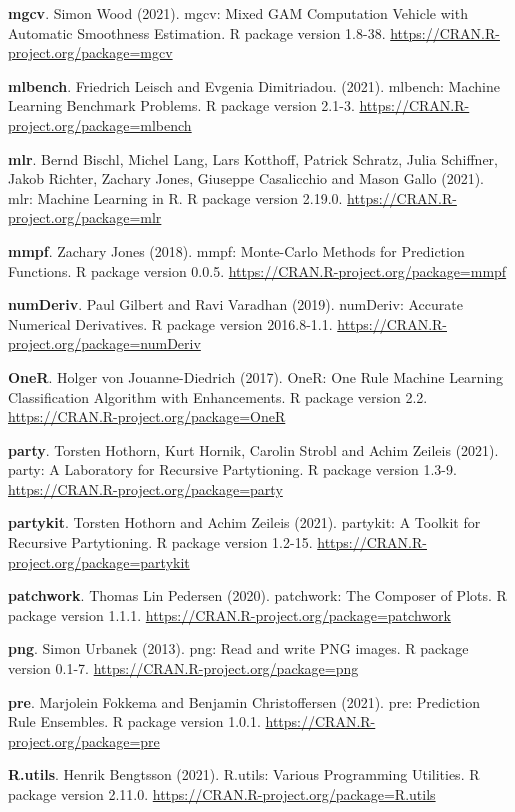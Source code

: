 \documentclass[
  11pt,
]{scrbook}
\begin{document}
\textbf{mgcv}. Simon Wood (2021). mgcv: Mixed GAM Computation Vehicle with Automatic Smoothness
Estimation. R package version 1.8-38. \url{https://CRAN.R-project.org/package=mgcv}

\textbf{mlbench}. Friedrich Leisch and Evgenia Dimitriadou. (2021). mlbench: Machine Learning Benchmark Problems. R package version 2.1-3. \url{https://CRAN.R-project.org/package=mlbench}

\textbf{mlr}. Bernd Bischl, Michel Lang, Lars Kotthoff, Patrick Schratz, Julia Schiffner, Jakob Richter, Zachary Jones, Giuseppe Casalicchio and Mason Gallo (2021). mlr: Machine Learning in R. R package version 2.19.0. \url{https://CRAN.R-project.org/package=mlr}

\textbf{mmpf}. Zachary Jones (2018). mmpf: Monte-Carlo Methods for Prediction Functions. R package version 0.0.5. \url{https://CRAN.R-project.org/package=mmpf}

\textbf{numDeriv}. Paul Gilbert and Ravi Varadhan (2019). numDeriv: Accurate Numerical Derivatives. R package version 2016.8-1.1. \url{https://CRAN.R-project.org/package=numDeriv}

\textbf{OneR}. Holger von Jouanne-Diedrich (2017). OneR: One Rule Machine Learning Classification Algorithm with
Enhancements. R package version 2.2. \url{https://CRAN.R-project.org/package=OneR}

\textbf{party}. Torsten Hothorn, Kurt Hornik, Carolin Strobl and Achim Zeileis (2021). party: A Laboratory for Recursive Partytioning. R package version 1.3-9. \url{https://CRAN.R-project.org/package=party}

\textbf{partykit}. Torsten Hothorn and Achim Zeileis (2021). partykit: A Toolkit for Recursive Partytioning. R package version 1.2-15. \url{https://CRAN.R-project.org/package=partykit}

\textbf{patchwork}. Thomas Lin Pedersen (2020). patchwork: The Composer of Plots. R package version 1.1.1. \url{https://CRAN.R-project.org/package=patchwork}

\textbf{png}. Simon Urbanek (2013). png: Read and write PNG images. R package version 0.1-7. \url{https://CRAN.R-project.org/package=png}

\textbf{pre}. Marjolein Fokkema and Benjamin Christoffersen (2021). pre: Prediction Rule Ensembles. R package version 1.0.1. \url{https://CRAN.R-project.org/package=pre}

\textbf{R.utils}. Henrik Bengtsson (2021). R.utils: Various Programming Utilities. R package version 2.11.0. \url{https://CRAN.R-project.org/package=R.utils}
\end{document}
